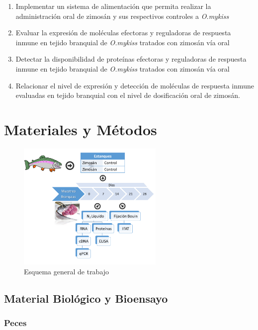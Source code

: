 \documentclass[12pt,a4paper,oneside]{scrbook}
\begin{document}
\begin{enumerate}
\def\labelenumi{\arabic{enumi}.}
\itemsep1pt\parskip0pt
\item
  Implementar un sistema de alimentación que permita realizar la
  administración oral de zimosán y sus respectivos controles a
  \emph{O.mykiss}
\item
  Evaluar la expresión de moléculas efectoras y reguladoras de respuesta
  inmune en tejido branquial de \emph{O.mykiss} tratados con zimosán vía
  oral
\item
  Detectar la disponibilidad de proteínas efectoras y reguladoras de
  respuesta inmune en tejido branquial de \emph{O.mykiss} tratados con
  zimosán vía oral
\item
  Relacionar el nivel de expresión y detección de moléculas de respuesta
  inmune evaluadas en tejido branquial con el nivel de dosificación oral
  de zimosán.
\end{enumerate}

\clearpage

\chapter{Materiales y Métodos}

\begin{figure}[h!]
    \centering
        \includegraphics[width=7cm]{esquema} 
    \caption {Esquema general de trabajo}
    \label {fig:esquema}
\end{figure}

\section{Material Biológico y Bioensayo}

\subsection{Peces}
\end{document}
